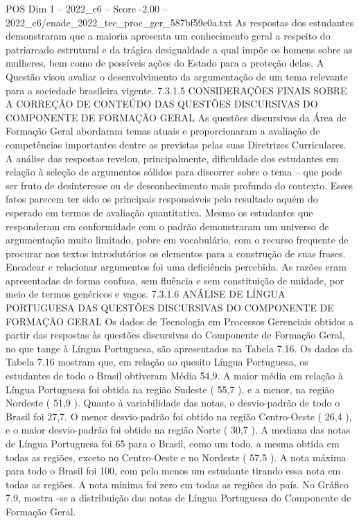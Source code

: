 \begin{textsample}{POS Dim 1 – 2022\_c6 – Score -2.00 – 2022\_c6/enade\_2022\_tec\_proc\_ger\_587bf59e0a.txt}
As respostas dos estudantes demonstraram que a maioria apresenta um conhecimento geral a respeito do patriarcado estrutural e da trágica desigualdade a qual impõe os homens sobre as mulheres, bem como de possíveis ações do Estado para a proteção delas.
A Questão visou avaliar o desenvolvimento da argumentação de um tema relevante para a sociedade brasileira vigente. 7.3.1.5 CONSIDERAÇÕES FINAIS SOBRE A CORREÇÃO DE CONTEÚDO DAS QUESTÕES DISCURSIVAS DO COMPONENTE DE FORMAÇÃO GERAL As questões discursivas da Área de Formação Geral abordaram temas atuais e proporcionaram a avaliação de competências importantes dentre as previstas pelas suas Diretrizes Curriculares.
A análise das respostas revelou, principalmente, dificuldade dos estudantes em relação à seleção de argumentos sólidos para discorrer sobre o tema – que pode ser fruto de desinteresse ou de desconhecimento mais profundo do contexto.
Esses fatos parecem ter sido os principais responsáveis pelo resultado aquém do esperado em termos de avaliação quantitativa.
Mesmo os estudantes que responderam em conformidade com o padrão demonstraram um universo de argumentação muito limitado, pobre em vocabulário, com o recurso frequente de procurar nos textos introdutórios os elementos para a construção de suas frases.
Encadear e relacionar argumentos foi uma deficiência percebida.
As razões eram apresentadas de forma confusa, sem fluência e sem constituição de unidade, por meio de termos genéricos e vagos. 7.3.1.6 ANÁLISE DE LÍNGUA PORTUGUESA DAS QUESTÕES DISCURSIVAS DO COMPONENTE DE FORMAÇÃO GERAL Os dados de Tecnologia em Processos Gerenciais obtidos a partir das respostas às questões discursivas do Componente de Formação Geral, no que tange à Língua Portuguesa, são apresentados na Tabela 7.16.
Os dados da Tabela 7.16 mostram que, em relação ao quesito Língua Portuguesa, os estudantes de todo o Brasil obtiveram Média 54,9.
A maior média em relação à Língua Portuguesa foi obtida na região Sudeste ( 55,7 ), e a menor, na região Nordeste ( 51,9 ).
Quanto à variabilidade das notas, o desvio-padrão de todo o Brasil foi 27,7.
O menor desvio-padrão foi obtido na região Centro-Oeste ( 26,4 ), e o maior desvio-padrão foi obtido na região Norte ( 30,7 ).
A mediana das notas de Língua Portuguesa foi 65 para o Brasil, como um todo, a mesma obtida em todas as regiões, exceto no Centro-Oeste e no Nordeste ( 57,5 ).
A nota máxima para todo o Brasil foi 100, com pelo menos um estudante tirando essa nota em todas as regiões.
A nota mínima foi zero em todas as regiões do país.
No Gráfico 7.9, mostra -se a distribuição das notas de Língua Portuguesa do Componente de Formação Geral.

\end{textsample}
